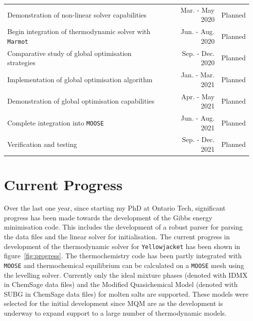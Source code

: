 \begin{table}[!htbp]
\begin{tabular}{@{}l r r@{}}
		Demonstration of non-linear solver capabilities & Mar. - May 2020 & Planned\\
		Begin integration of thermodynamic solver with \texttt{Marmot} & Jun. - Aug. 2020 & Planned\\
		Comparative study of global optimisation strategies & Sep. - Dec. 2020 & Planned\\
		Implementation of global optimisation algorithm & Jan. - Mar. 2021 & Planned\\
		Demonstration of global optimisation capabilities & Apr. - May 2021 & Planned\\
		Complete integration into \texttt{MOOSE} & Jun. - Aug. 2021 & Planned\\
		Verification and testing & Sep. - Dec. 2021 & Planned\\
		\bottomrule
      		\end{tabular}
	\end{table}

\section{Current Progress}
	Over the last one year, since starting my PhD at Ontario Tech, significant progress has been made towards the development of the Gibbs energy minimisation code. This includes the development of a robust parser for parsing the data files and the linear solver for initialisation. The current progress in development of the thermodynamic solver for \texttt{Yellowjacket} has been shown in figure~\ref{fig:progress}. The thermochemistry code has been partly integrated with \texttt{MOOSE} and thermochemical equilibrium can be calculated on a \texttt{MOOSE} mesh using the levelling solver. Currently only the ideal mixture phases (denoted with IDMX in ChemSage data files) and the Modified Quasichemical Model (denoted with SUBG in ChemSage data files) for molten salts are supported. These models were selected for the initial development since MQM  are  as the development is underway to expand support to a large number of thermodynamic models.

